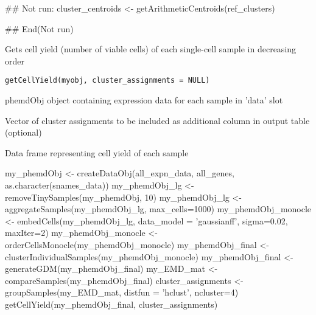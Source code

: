 \documentclass[a4paper]{book}
\begin{document}
%
\begin{Examples}
\begin{ExampleCode}
## Not run: 
cluster_centroids <- getArithmeticCentroids(ref_clusters)

## End(Not run)
\end{ExampleCode}
\end{Examples}
%
\begin{Description}\relax
Gets cell yield (number of viable cells) of each single-cell sample in decreasing order
\end{Description}
%
\begin{Usage}
\begin{verbatim}
getCellYield(myobj, cluster_assignments = NULL)
\end{verbatim}
\end{Usage}
%
\begin{Arguments}
\begin{ldescription}
\item[\code{myobj}] phemdObj object containing expression data for each sample in 'data' slot

\item[\code{cluster\_assignments}] Vector of cluster assignments to be included as additional column in output table (optional)
\end{ldescription}
\end{Arguments}
%
\begin{Value}
Data frame representing cell yield of each sample
\end{Value}
%
\begin{Examples}
\begin{ExampleCode}

my_phemdObj <- createDataObj(all_expn_data, all_genes, as.character(snames_data))
my_phemdObj_lg <- removeTinySamples(my_phemdObj, 10)
my_phemdObj_lg <- aggregateSamples(my_phemdObj_lg, max_cells=1000)
my_phemdObj_monocle <- embedCells(my_phemdObj_lg, data_model = 'gaussianff', sigma=0.02, maxIter=2)
my_phemdObj_monocle <- orderCellsMonocle(my_phemdObj_monocle)
my_phemdObj_final <- clusterIndividualSamples(my_phemdObj_monocle)
my_phemdObj_final <- generateGDM(my_phemdObj_final)
my_EMD_mat <- compareSamples(my_phemdObj_final)
cluster_assignments <- groupSamples(my_EMD_mat, distfun = 'hclust', ncluster=4)
getCellYield(my_phemdObj_final, cluster_assignments)

\end{ExampleCode}
\end{Examples}
\end{document}
